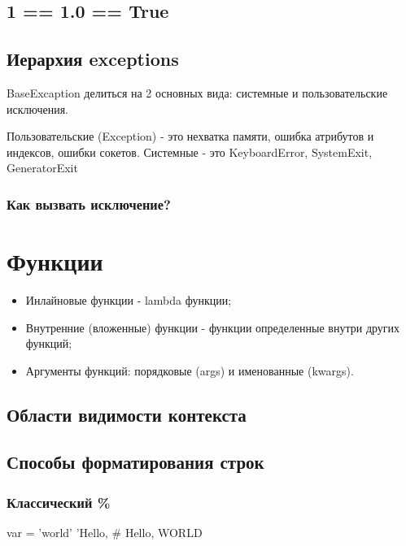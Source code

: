 \subsection{1 == 1.0 == True}

\subsection{Иерархия exceptions}

BaseExcaption делиться на 2 основных вида: системные и пользовательские исключения.

Пользовательские (Exception) - это нехватка памяти, ошибка атрибутов и индексов, ошибки сокетов.
Системные - это KeyboardError, SystemExit, GeneratorExit 

\subsubsection{Как вызвать исключение?}



\section{Функции}

\begin{itemize}
    \item Инлайновые функции - lambda функции;
    \item Внутренние (вложенные) функции - функции определенные внутри других функций;
    \item Аргументы функций: порядковые (args) и именованные (kwargs).
\end{itemize}

\subsection{Области видимости контекста}

\subsection{Способы форматирования строк}

\subsubsection{Классический \%}

\begin{python}
var = 'world'
'Hello, %
# Hello, WORLD 
\end{python}

